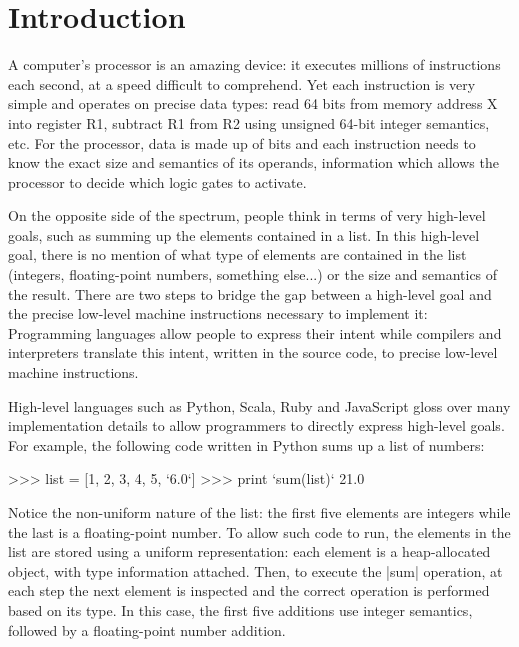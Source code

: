 \chapter{Introduction}

A computer's processor is an amazing device: it executes millions of instructions each second, at a speed difficult to comprehend. Yet each instruction is very simple and operates on precise data types: read 64 bits from memory address X into register R1, subtract R1 from R2 using unsigned 64-bit integer semantics, etc. For the processor, data is made up of bits and each instruction needs to know the exact size and semantics of its operands, information which allows the processor to decide which logic gates to activate.

On the opposite side of the spectrum, people think in terms of very high-level goals, such as summing up the elements contained in a list. In this high-level goal, there is no mention of what type of elements are contained in the list (integers, floating-point numbers, something else...) or the size and semantics of the result. There are two steps to bridge the gap between a high-level goal and the precise low-level machine instructions necessary to implement it: Programming languages allow people to express their intent while compilers and interpreters translate this intent, written in the source code, to precise low-level machine instructions.

High-level languages such as Python, Scala, Ruby and JavaScript gloss over many implementation details to allow programmers to directly express high-level goals. For example, the following code written in Python sums up a list of numbers:

\begin{lstlisting-nobreak}
 >>> list = [1, 2, 3, 4, 5, `6.0`]
 >>> print `sum(list)`
 21.0
\end{lstlisting-nobreak}

Notice the non-uniform nature of the list: the first five elements are integers while the last is a floating-point number. To allow such code to run, the elements in the list are stored using a uniform representation: each element is a heap-allocated object, with type information attached. Then, to execute the |sum| operation, at each step the next element is inspected and the correct operation is performed based on its type. In this case, the first five additions use integer semantics, followed by a floating-point number addition. %

